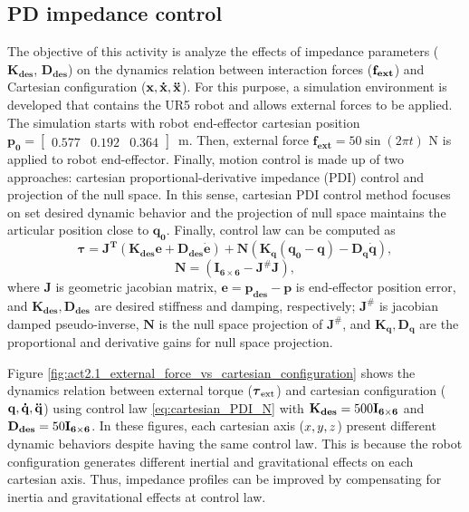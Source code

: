 \graphicspath{{images/act_2.1/}}
\subsection{PD impedance control}
The objective of this activity is analyze the effects of impedance parameters ($\mathbf{K_{des}}$, $\mathbf{D_{des}}$) on the dynamics relation between interaction forces ($\mathbf{f_{ext}}$) and Cartesian configuration ($\mathbf{x, \dot{x}, \ddot{x}}$). For this purpose, a simulation environment is developed that contains the UR5 robot and allows external forces to be applied. The simulation starts with robot end-effector cartesian position $\mathbf{p_0}=\begin{bmatrix}  0.577 &   0.192 &   0.364 \end{bmatrix}$~m. Then, external force $\mathbf{f_{ext}}= 50\sin{(2\pi t)}$ N is applied to robot end-effector. Finally, motion control is made up of two approaches: cartesian proportional-derivative impedance (PDI) control and projection of the null space. In this sense, cartesian PDI control method focuses on set desired dynamic behavior and the projection of null space maintains the articular position close to $\mathbf{q_0}$. Finally, control law can be computed as 
\begin{equation}
	\boldsymbol{\tau}
	= \mathbf{J^T} (\mathbf{K_{des} e} + \mathbf{D_{des} \dot{e}}) + \mathbf{N} \left(\mathbf{K_q(q_0-q) - D_q \dot{q}} \right),
	\label{eq:cartesian_PDI_N}
\end{equation}
\begin{equation*}
	\mathbf{N}=(\mathbf{I_{6 \times 6}} - \mathbf{J^{\#} J} ),
\end{equation*}
\noindent where $\mathbf{J}$ is geometric jacobian matrix, $\mathbf{e}=\mathbf{p_{des} - p}$ is end-effector position error, and $\mathbf{K_{des}, D_{des}}$ are desired stiffness and damping, respectively; $\mathbf{J^{\#}}$ is jacobian damped pseudo-inverse, $\mathbf{N}$ is the null space projection of $\mathbf{J^{\#}}$, and $\mathbf{K_q, D_q}$ are the proportional and derivative gains for null space projection. 



Figure \ref{fig:act2.1_external_force_vs_cartesian_configuration} shows the dynamics relation between external torque ($\boldsymbol{\tau}_\mathrm{ext}$) and cartesian configuration ($\mathbf{q, \dot{q}, \ddot{q}}$) using control law \eqref{eq:cartesian_PDI_N} with $\mathbf{K_{des}}=500\mathbf{I_{6 \times 6}}$ and $\mathbf{D_{des}}=50\mathbf{I_{6 \times 6}}$. In these figures, each cartesian axis ($x, y, z$) present different dynamic behaviors despite having the same control law. This is because the robot configuration generates different inertial and gravitational effects on each cartesian axis. Thus, impedance profiles can be improved by compensating for inertia and gravitational effects at control law.


